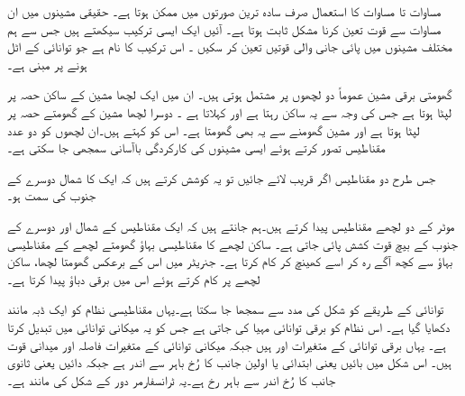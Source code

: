 مساوات  تا مساوات  کا استعمال صرف سادہ ترین صورتوں میں ممکن ہوتا ہے۔ حقیقی  مشینوں میں ان مساوات سے قوت  تعین کرنا مشکل ثابت ہوتا ہے۔ آئیں  ایک ایسی ترکیب  سیکھتے ہیں جس سے ہم  مختلف مشینوں میں پائی جانی والی  قوتیں  تعین کر سکیں ۔ اس ترکیب کا نام ہے  جو توانائی کے اٹل ہونے پر مبنی ہے۔

گھومتی برقی مشین عموماً دو لچھوں پر مشتمل ہوتی ہیں۔ ان میں ایک لچھا  مشین کے ساکن حصہ پر لپٹا ہوتا ہے جس کی وجہ سے یہ ساکن رہتا ہے اور    کہلاتا ہے ۔  دوسرا لچھا  مشین کے گھومتے   حصہ پر لپٹا ہوتا ہے اور مشین گھومنے سے یہ بھی گھومتا ہے۔ اس کو   کہتے ہیں۔ان  لچھوں کو دو عدد مقناطیس تصور کرتے ہوئے ایسی مشینوں کی کارکردگی  باآسانی  سمجھی جا سکتی ہے۔

 جس طرح دو مقناطیس اگر قریب لائے جائیں تو یہ کوشش کرتے ہیں کہ ایک کا شمال  دوسرے کے جنوب  کی سمت  ہو۔

 موٹر کے دو  لچھے مقناطیس پیدا کرتے ہیں۔ہم جانتے ہیں کہ  ایک مقناطیس  کے شمال  اور دوسرے کے جنوب  کے بیچ قوت کشش پائی جاتی ہے۔ ساکن لچھے کا مقناطیسی بہاؤ  گھومتے لچھے کے مقناطیسی بہاؤ سے کچھ آگے رہ کر اسے کھینچ  کر  کام کرتا ہے۔ جنریٹر میں اس کے برعکس  گھومتا لچھا، ساکن لچھے پر کام کرتے ہوئے اس میں برقی دباؤ پیدا کرتا ہے۔

توانائی کے طریقے کو شکل   کی مدد سے سمجھا جا سکتا ہے۔یہاں مقناطیسی نظام کو ایک ڈبہ  مانند دکھایا گیا ہے۔ اس نظام کو برقی توانائی مہیا کی جاتی ہے جس کو یہ میکانی توانائی میں تبدیل کرتا ہے۔ یہاں برقی توانائی کے متغیرات   اور  ہیں جبکہ میکانی توانائی کے متغیرات فاصلہ  اور میدانی قوت  ہیں۔ اس شکل میں بائیں یعنی ابتدائی یا اولین جانب  کا رُخ باہر سے اندر ہے جبکہ  دائیں یعنی ثانوی جانب   کا رُخ اندر سے  باہر رخ ہے۔یہ  ٹرانسفارمر دور کے شکل   کی مانند ہے۔


